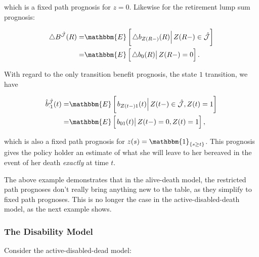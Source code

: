 \documentclass{article}
\newcommand{\1}[1]{\mathbbm{1}_{\left\lbrace #1 \right\rbrace}}
\newcommand{\econd}[2][def]{\mathbbm{E} \left[ \left. #1 \right| #2 \right]}
\theoremstyle{break}
\theoremstyle{remark}
\numberwithin{equation}{section}
\begin{document}
which is a fixed path prognosis for $z=0$. Likewise for the retirement lump sum prognosis:

\begin{align*}
    \triangle B^{\hat{\mathcal{J}}}(R) =& \econd[\triangle b_{Z(R-)}(R)]{Z(R-) \in \hat{\mathcal{J}}} \\
    =& \econd[\triangle b_0(R)]{Z(R-) = 0}.
\end{align*}

With regard to the only transition benefit prognosis, the state $1$ transition, we have

\begin{align*}
\hat{b}_{\cdot 1}^{\hat{\mathcal{J}}}(t) =& \econd[b_{Z(t-)1}(t)]{Z(t-) \in \hat{\mathcal{J}}, Z(t)=1} \\
=& \econd[b_{01}(t)]{Z(t-)=0, Z(t)=1},
\end{align*}

which is also a fixed path prognosis for $z(s)=\1{s \geq t}$. This prognosis gives the policy holder an estimate of what she will leave to her bereaved in the event of her death \textit{exactly} at time $t$.

\bigskip
\bigskip
\bigskip

The above example demonstrates that in the alive-death model, the restricted path prognoses don't really bring anything new to the table, as they simplify to fixed path prognoses. This is no longer the case in the active-disabled-death model, as the next example shows.

\subsubsection{The Disability Model} \label{DisModel}

Consider the active-disabled-dead model:
\end{document}
